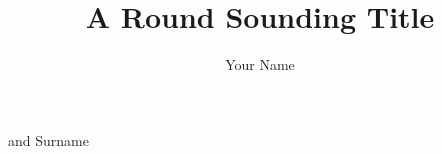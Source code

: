 \documentclass{TUD-dissertation2020}
\begin{document}
\title[A  nicely Rimbombant subtitle to show off]{A Round Sounding Title }
\author{Your Name }{and Surname}

\frontmatter





\tableofcontents


\mainmatter


\printbibliography
\appendix
{}
\setcounter{page}{1}


\end{document}
